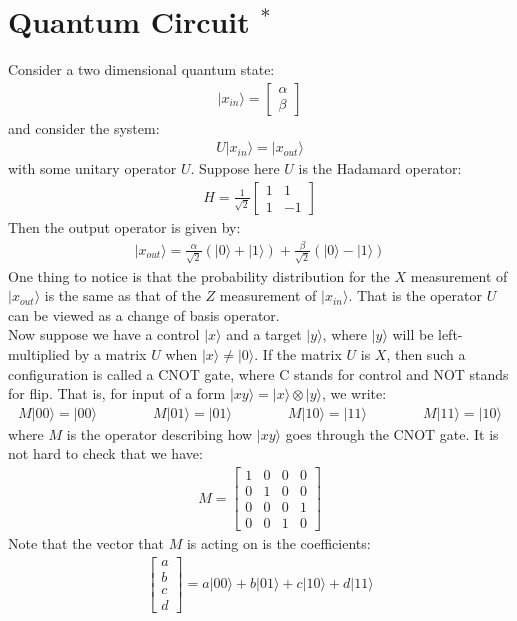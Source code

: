 \documentclass[11pt]{book}
\theoremstyle{break}
\theoremstyle{break}
\newcommand{\bmat}[1]{\begin{bmatrix} #1 \end{bmatrix}}
\begin{document}
\newpage
\section[Quantum Circuit $^*$]{\color{red}Quantum Circuit $^*$\color{black}}
Consider a two dimensional quantum state:
\begin{align*}
|x_{in}\rangle = \bmat{\alpha \\ \beta}
\end{align*}
and consider the system:
\begin{align*}
U|x_{in}\rangle = |x_{out}\rangle
\end{align*}
with some unitary operator $U$. Suppose here $U$ is the Hadamard operator:
\begin{align*}
H = \frac{1}{\sqrt{2}}\bmat{1 & 1 \\ 1 & -1}
\end{align*}
Then the output operator is given by:
\begin{align*}
|x_{out}\rangle = \frac{\alpha}{\sqrt{2}}\left( |0 \rangle + |1\rangle \right) + \frac{\beta}{\sqrt{2}}\left( |0\rangle - |1\rangle\right)
\end{align*}
One thing to notice is that the probability distribution for the $X$ measurement of $|x_{out}\rangle$ is the same as that of the $Z$ measurement of $|x_{in}\rangle$. That is the operator $U$ can be viewed as a change of basis operator. \\

Now suppose we have a control $|x\rangle$ and a target $|y\rangle$, where $|y\rangle$ will be left-multiplied by a matrix $U$ when $|x\rangle\neq |0\rangle$. If the matrix $U$ is $X$, then such a configuration is called a CNOT gate, where C stands for control and NOT stands for flip. That is, for input of a form $|xy\rangle = |x\rangle \otimes |y\rangle$, we write:
\begin{align*}
M |00\rangle = |00\rangle \qquad\qquad M|01\rangle = |01\rangle \qquad\qquad M|10\rangle = |11\rangle \qquad\qquad M|11\rangle = |10\rangle
\end{align*}
where $M$ is the operator describing how $|xy\rangle$ goes through the CNOT gate. It is not hard to check that we have:
\begin{align*}
M = \bmat{1 & 0 & 0 & 0\\
0 & 1 & 0 & 0\\
0 & 0 & 0 & 1\\
0 & 0 & 1 & 0}
\end{align*}
Note that the vector that $M$ is acting on is the coefficients:
\begin{align*}
\bmat{a\\b\\c\\d} = a|00\rangle + b |01\rangle + c|10\rangle + d|11\rangle
\end{align*}
\end{document}
